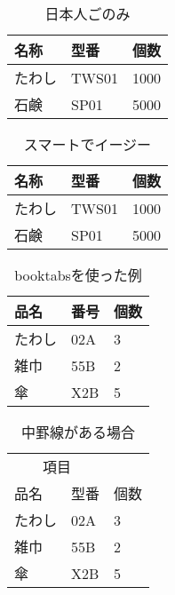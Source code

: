 ﻿\documentclass[a4j,11pt,papersize]{jsarticle}
\begin{document}
\begin{table}[htbp]
 \begin{center}
  \caption{日本人ごのみ}
  \begin{tabular}{|l||l|l|}
   \hline
   名称   & 型番  & 個数 \\
   \hline \hline
   たわし & TWS01 & 1000 \\
   \hline
   石鹸   & SP01  & 5000 \\
   \hline
  \end{tabular}
 \end{center}
\end{table}

\begin{table}[htbp]
\begin{center}
 \caption{スマートでイージー}
 \begin{tabular}{lll}
 \hline
 名称   & 型番  & 個数 \\
 \hline
 たわし & TWS01 & 1000 \\
 石鹸   & SP01  & 5000 \\
 \hline
\end{tabular}
\end{center} 
\end{table}

\begin{table}[htbp]
 \begin{center}
  \caption{\textsf{booktabs}を使った例}
  \begin{tabular}{lll}
   \toprule
   品名 & 番号 & 個数 \\
   \midrule
   たわし & 02A & 3 \\
   雑巾   & 55B & 2 \\
   傘     & X2B & 5 \\
   \bottomrule
  \end{tabular}
 \end{center} 
\end{table}

\begin{table}[htbp]
 \begin{center}
  \caption{中罫線がある場合}
  \begin{tabular}{lll}
   \toprule
   \multicolumn{2}{c}{項目} & \\
   \cmidrule{1-2}
   品名 & 型番 & 個数\\
   \midrule
   たわし & 02A & 3 \\
   雑巾   & 55B & 2 \\
   傘     & X2B & 5 \\
   \bottomrule
  \end{tabular}
 \end{center}
\end{table}
\end{document}
